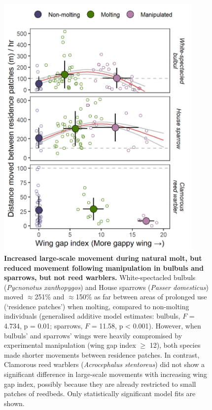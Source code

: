 \begin{refsection}
\begin{figure}[!h]
\centering
\includegraphics[width=0.9\textwidth]{figures/holeybirds/fig_01.png}
\caption{
    \textbf{Increased large-scale movement during natural molt, but reduced movement following manipulation in bulbuls and sparrows, but not reed warblers.}
    White-spectacled bulbuls (\textit{Pycnonotus xanthopygos}) and House sparrows (\textit{Passer domesticus}) moved $\approx$251\% and $\approx$150\% as far between areas of prolonged use (`residence patches') when molting, compared to non-molting individuals (generalised additive model estimates: bulbuls, $F$ = 4.734, p = 0.01; sparrows, $F$ = 11.58, p < 0.001).
    However, when bulbuls' and sparrows' wings were heavily compromised by experimental manipulation (wing gap index $\geq$ 12), both species made shorter movements between residence patches.
    In contrast, Clamorous reed warblers (\textit{Acrocephalus stentoreus}) did not show a significant difference in large-scale movements with increasing wing gap index, possibly because they are already restricted to small patches of reedbeds.
    Only statistically significant model fits are shown.
}\label{fig_holey_01}
\end{figure}


\end{refsection}
